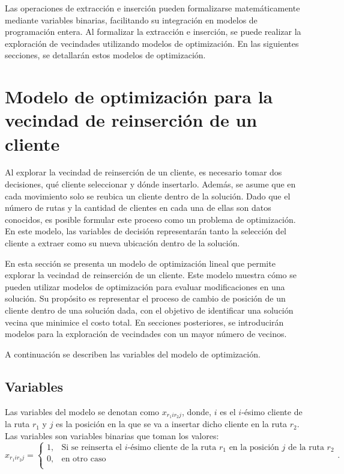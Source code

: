 \documentclass[12pt]{report}
\begin{document}
	Las operaciones de extracción e inserción pueden formalizarse matemáticamente mediante variables binarias, facilitando su integración en modelos de programación entera. Al formalizar la extracción e inserción, se puede realizar la exploración de vecindades utilizando modelos de optimización. En las siguientes secciones, se detallarán estos modelos de optimización.

		\section {Modelo de optimización para la vecindad de reinserción de un cliente}
	\label{sec:Modelo de optimización para la vecindad de reinserción de un cliente}

	Al explorar la vecindad de reinserción de un cliente, es necesario tomar dos decisiones, qué cliente seleccionar y dónde insertarlo. Además, se asume que en cada movimiento solo se reubica un cliente dentro de la solución. Dado que el número de rutas y la cantidad de clientes en cada una de ellas son datos conocidos, es posible formular este proceso como un problema de optimización. En este modelo, las variables de decisión representarán tanto la selección del cliente a extraer como su nueva ubicación dentro de la solución.

	En esta sección se presenta un modelo de optimización lineal que permite explorar la vecindad de reinserción de un cliente. Este modelo muestra cómo se pueden utilizar modelos de optimización para evaluar modificaciones en una solución. Su propósito es representar el proceso de cambio de posición de un cliente dentro de una solución dada, con el objetivo de identificar una solución vecina que minimice el costo total. En secciones posteriores, se introducirán modelos para la exploración de vecindades con un mayor número de vecinos.

	A continuación se describen las variables del modelo de optimización.

	\subsection{Variables}
	Las variables del modelo se denotan como $x_{r_1ir_2j}$, donde, $i$ es el $i$-ésimo cliente de la ruta $r_1$ y $j$ es la posición en la que se va a insertar dicho cliente en la ruta $r_2$. Las variables son variables binarias que toman los valores:
	\[
	x_{r_1ir_2j}=
	\begin{cases}
		1, & \text{Si se reinserta el $i$-ésimo cliente de la ruta $r_1$ en la posición $j$ de la ruta $r_2$}\\
		0, & \text{en otro caso}\\
	\end{cases}
	.
      \]
\end{document}
